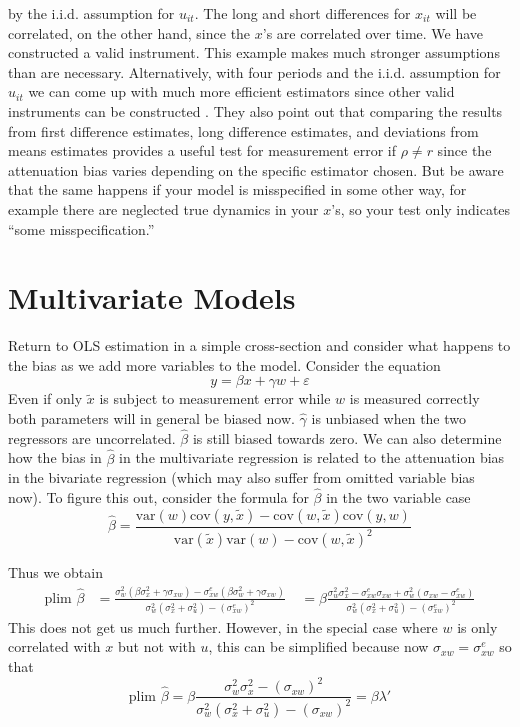 \documentclass[12pt]{article}
\begin{document}
by the i.i.d. assumption for $u_{it}$. The long and short differences for $x_{it}$ will be correlated, on the other hand, since the $x$'s are correlated over time. We have constructed a valid instrument. This example makes much stronger assumptions than are necessary. Alternatively, with four periods and the i.i.d. assumption for $u_{it}$ we can come up with much more efficient estimators since other valid instruments can be constructed \cite{Griliches_Hausman_1986}. They also point out that comparing the results from first difference estimates, long difference estimates, and deviations from means estimates provides a useful test for measurement error if $\rho \neq r$ since the attenuation bias varies depending on the specific estimator chosen. But be aware that the same happens if your model is misspecified in some other way, for example there are neglected true dynamics in your $x$'s, so your test only indicates ``some misspecification.''

\section*{Multivariate Models}
Return to OLS estimation in a simple cross-section and consider what happens to the bias as we add more variables to the model. Consider the equation
\begin{equation}
\label{eq:10}
y = \beta x + \gamma w + \varepsilon
\end{equation}
Even if only $\tilde{x}$ is subject to measurement error while $w$ is measured correctly both parameters will in general be biased now. $\hat{\gamma}$ is unbiased when the two regressors are uncorrelated. $\hat{\beta}$ is still biased towards zero. We can also determine how the bias in $\hat{\beta}$ in the multivariate regression is related to the attenuation bias in the bivariate regression (which may also suffer from omitted variable bias now). To figure this out, consider the formula for $\hat{\beta}$ in the two variable case
\[
\hat{\beta} = \frac{\text{var}(w)\text{cov}(y, \tilde{x}) - \text{cov}(w, \tilde{x})\text{cov}(y, w)}{\text{var}(\tilde{x})\text{var}(w) - \text{cov}(w, \tilde{x})^2}
\]

Thus we obtain
\begin{align*}
\text{plim } \hat{\beta} &= \frac{\sigma_w^2(\beta\sigma_x^2 + \gamma\sigma_{xw}) - \sigma_{xw}^{e}(\beta\sigma_w^2 + \gamma\sigma_{xw})}{\sigma_w^2(\sigma_x^2 + \sigma_u^2) - (\sigma_{xw}^{e})^2}\
&= \beta \frac{\sigma_w^2\sigma_x^2 - \sigma_{xw}^{e}\sigma_{xw} + \sigma_w^2(\sigma_{xw} - \sigma_{xw}^{e})}{\sigma_w^2(\sigma_x^2 + \sigma_u^2) - (\sigma_{xw}^{e})^2}
\end{align*}
This does not get us much further. However, in the special case where $w$ is only correlated with $x$ but not with $u$, this can be simplified because now $\sigma_{xw} = \sigma_{xw}^{e}$ so that
\begin{equation}
\label{eq:11}
\text{plim } \hat{\beta} = \beta \frac{\sigma_w^2\sigma_x^2 - (\sigma_{xw})^2}{\sigma_w^2(\sigma_x^2 + \sigma_u^2) - (\sigma_{xw})^2} = \beta\lambda'
\end{equation}
\end{document}

